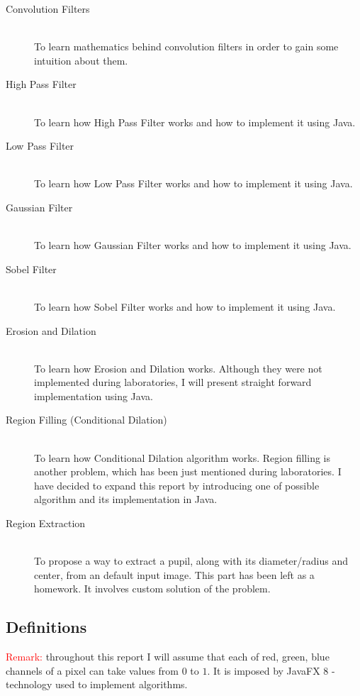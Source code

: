 \documentclass{article}
\begin{document}
\begin{description}
\item[Convolution Filters] \hfill \\
To learn mathematics behind convolution filters in order to gain some intuition about them.
\item[High Pass Filter] \hfill \\
To learn how High Pass Filter works and how to implement it using Java.
\item[Low Pass Filter] \hfill \\
To learn how Low Pass Filter works and how to implement it using Java.
\item[Gaussian Filter] \hfill \\
To learn how Gaussian Filter works and how to implement it using Java. 
\item[Sobel Filter] \hfill \\
To learn how Sobel Filter works and how to implement it using Java.
\item[Erosion and Dilation] \hfill \\
To learn how Erosion and Dilation works. Although they were not implemented during laboratories, I will present straight forward implementation using Java. 
\item[Region Filling (Conditional Dilation)] \hfill \\
To learn how Conditional Dilation algorithm works. Region filling is another problem, which has been just mentioned during laboratories. I have decided to expand this report by introducing one of possible algorithm and its implementation in Java.
\item[Region Extraction] \hfill \\
To propose a way to extract a pupil, along with its diameter/radius and center, from an default input image.
This part has been left as a homework. It involves custom solution of the problem.
\end{description}

\subsection{Definitions}
\label{definitions}
\textcolor{red}{Remark:} throughout this report I will assume that each of red, green, blue channels of a pixel can take values from $0$ to $1$. It is imposed by JavaFX 8 - technology used to implement algorithms.
\end{document}
